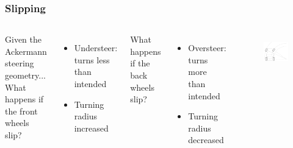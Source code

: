 \documentclass{beamer}
\begin{document}
\begin{frame}
\frametitle{Slipping}
\begin{columns}[t]
  Given the Ackermann steering geometry... \\
  \vspace{2\baselineskip}
  What happens if the front wheels slip?
   {
  \begin{itemize}
    \item Understeer: turns less than intended
    \item Turning radius increased
  \end{itemize}
  \vspace{\baselineskip}
  What happens if the back wheels slip?
  }
   {
  \begin{itemize}
    \item Oversteer: turns more than intended
    \item Turning radius decreased
  \end{itemize}
  }
  \begin{figure}
    \centering
    \includegraphics[width=1.0\columnwidth]{images-dis12/car-top-ackermann} \\
  \end{figure}
\end{columns}
\end{frame}
\end{document}
